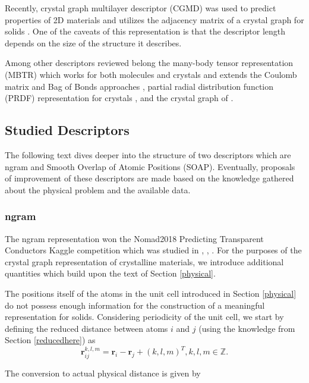 \documentclass[11pt,oneside,czech,american]{book} %
\theoremstyle{definition} %
\theoremstyle{definition}
\begin{document}
Recently, crystal graph multilayer descriptor (CGMD) was used to predict properties of 2D materials \parencite{lu20} and utilizes the adjacency matrix of a crystal graph for solids \parencite{xie18}. One of the caveats of this representation is that the descriptor length depends on the size of the structure it describes.

Among other descriptors reviewed belong the many-body tensor representation (MBTR) which works for both molecules and crystals and extends the Coulomb matrix and Bag of Bonds approaches \parencite{huo17}, partial radial distribution function (PRDF) representation for crystals \parencite{schutt14}, and the crystal graph of \parencite{xie18}.
\subsection{Studied Descriptors}
The following text dives deeper into the structure of two descriptors which are ngram and Smooth Overlap of Atomic Positions (SOAP). Eventually, proposals of improvement of these descriptors are made based on the knowledge gathered about the physical problem and the available data.
\subsubsection{ngram}
The  ngram representation won the Nomad2018 Predicting Transparent Conductors Kaggle competition which was studied in \parencite{sutton18}, \parencite{sutton19}, \parencite{kaggle_web}. For the purposes of the crystal graph representation of crystalline materials, we introduce additional quantities which build upon the text of Section \ref{physical}.

The positions itself of the atoms in the unit cell introduced in Section \ref{physical} do not possess enough information for the construction of a meaningful representation for solids. Considering periodicity of the unit cell, we start by defining the reduced distance between atoms $i$ and $j$ (using the knowledge from Section \ref{reducedhere}) as
\begin{equation}
	\bm{r}^{k,l,m}_{ij} = \bm{r}_i - \bm{r}_j + (k, l, m)^T,    k,l,m \in \mathbb{Z}.
\end{equation}

The conversion to actual physical distance is given by
\end{document}
